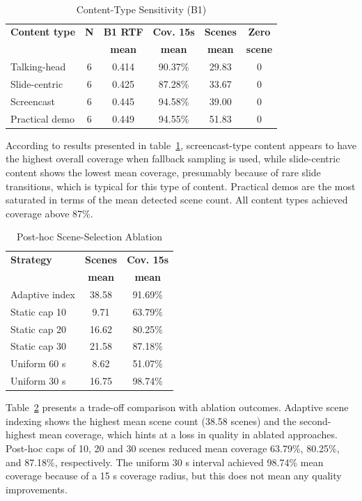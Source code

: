 ﻿﻿\documentclass[conference]{IEEEtran}
\begin{document}
\begin{table}[t]
\caption{Content-Type Sensitivity (B1)}
\label{tab:content_sensitivity}
\centering
\footnotesize
\setlength{\tabcolsep}{4.2pt}
\begin{tabular}{lccccc}
\toprule
\textbf{Content type} & \textbf{N} & \textbf{B1 RTF} & \textbf{Cov. 15s} & \textbf{Scenes} & \textbf{Zero} \\
 &  & \textbf{mean} & \textbf{mean} & \textbf{mean} & \textbf{scene} \\
\midrule
Talking-head & 6 & 0.414 & 90.37\% & 29.83 & 0 \\
Slide-centric & 6 & 0.425 & 87.28\% & 33.67 & 0 \\
Screencast & 6 & 0.445 & 94.58\% & 39.00 & 0 \\
Practical demo & 6 & 0.449 & 94.55\% & 51.83 & 0 \\
\bottomrule
\end{tabular}
\end{table}

According to results presented in table~\ref{tab:content_sensitivity}, screencast-type content appears to have the highest overall coverage when fallback sampling is used, while slide-centric content shows the lowest mean coverage, presumably because of rare slide transitions, which is typical for this type of content. Practical demos are the most saturated in terms of the mean detected scene count. All content types achieved coverage above 87\%.

\begin{table}[t]
\caption{Post-hoc Scene-Selection Ablation}
\label{tab:scene_ablation}
\centering
\footnotesize
\setlength{\tabcolsep}{5pt}
\begin{tabular}{lcc}
\toprule
\textbf{Strategy} & \textbf{Scenes} & \textbf{Cov. 15s} \\
 & \textbf{mean} & \textbf{mean} \\
\midrule
Adaptive index & 38.58 & 91.69\% \\
Static cap 10 & 9.71 & 63.79\% \\
Static cap 20 & 16.62 & 80.25\% \\
Static cap 30 & 21.58 & 87.18\% \\
Uniform 60 s & 8.62 & 51.07\% \\
Uniform 30 s & 16.75 & 98.74\% \\
\bottomrule
\end{tabular}
\end{table}

Table~\ref{tab:scene_ablation} presents a trade-off comparison with ablation outcomes. Adaptive scene indexing shows the highest mean scene count (38.58 scenes) and the second-highest mean coverage, which hints at a loss in quality in ablated approaches. Post-hoc caps of 10, 20 and 30 scenes reduced mean coverage 63.79\%, 80.25\%, and 87.18\%, respectively. The uniform 30 s interval achieved 98.74\% mean coverage because of a 15 s coverage radius, but this does not mean any quality improvements.
\end{document}
